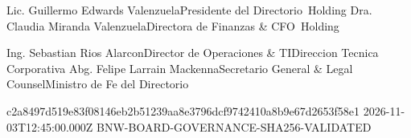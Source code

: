 \documentclass[11pt,a4paper]{article}
\begin{document}
\vspace{1mm}

\dualcontrolsignature%
  {Lic. Guillermo Edwards Valenzuela}{Presidente del Directorio}{\corporatebrandname\ Holding}%
  {Dra. Claudia Miranda Valenzuela}{Directora de Finanzas \& CFO}{\corporatebrandname\ Holding}

\dualcontrolsignature%
  {Ing. Sebastian Rios Alarcon}{Director de Operaciones \& TI}{Direccion Tecnica Corporativa}%
  {Abg. Felipe Larrain Mackenna}{Secretario General \& Legal Counsel}{Ministro de Fe del Directorio}

\vspace{2mm}

\cryptoseal%
  {c2a8497d519e83f08146eb2b51239aa8e3796dcf9742410a8b9e67d2653f58e1}%
  {2026-11-03T12:45:00.000Z}%
  {BNW-BOARD-GOVERNANCE-SHA256-VALIDATED}
\end{document}
